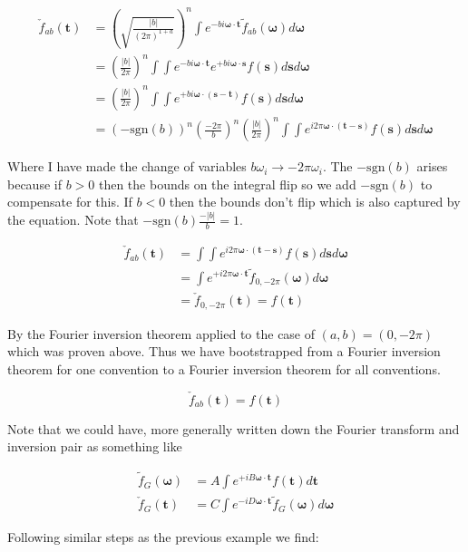 \documentclass[12pt]{article}
\newcommand{\bv}[1]{\boldsymbol{#1}}
\begin{document}
\begin{align*}
\check{f}_{ab}(\bv{t}) &= \left(\sqrt{\frac{|b|}{(2\pi)^{1+a}}}\right)^n\int e^{-b i\bv{\omega} \cdot \bv{t}}\tilde{f}_{ab}(\bv{\omega}) d\bv{\omega}\\
&= \left(\frac{|b|}{2\pi}\right)^n \int \int e^{-b i \bv{\omega} \cdot \bv{t}} e^{+ b i \bv{\omega} \cdot \bv{s}} f(\bv{s}) d\bv{s} d\bv{\omega}\\
&= \left(\frac{|b|}{2\pi}\right)^n \int \int e^{+b i \bv{\omega}\cdot(\bv{s}-\bv{t})} f(\bv{s}) d\bv{s} d\bv{\omega}\\
&= \left(-\text{sgn}(b)\right)^n \left( \frac{-2\pi}{b}\right)^n \left(\frac{|b|}{2\pi}\right)^n\int \int e^{i 2\pi \bv{\omega} \cdot (\bv{t}-\bv{s})}f(\bv{s}) d\bv{s} d\bv{\omega}
\end{align*}

Where I have made the change of variables $b \omega_i \to -2\pi \omega_i$. The $-\text{sgn}(b)$ arises because if $b>0$ then the bounds on the integral flip so we add $-\text{sgn}(b)$ to compensate for this. If $b<0$ then the bounds don't flip which is also captured by the equation. Note that $-\text{sgn}(b)\frac{-|b|}{b} =1$.

\begin{align}
\check{f}_{ab}(\bv{t}) &= \int \int e^{i 2\pi \bv{\omega} \cdot (\bv{t}-\bv{s})} f(\bv{s}) d\bv{s} d\bv{\omega}\\
&= \int e^{+i 2\pi \bv{\omega} \cdot \bv{t}} \tilde{f}_{0,-2\pi}(\bv{\omega}) d\bv{\omega}\\
&= \check{f}_{0,-2\pi}(\bv{t}) = f(\bv{t})
\end{align}

By the Fourier inversion theorem applied to the case of $(a,b) = (0,-2\pi)$ which was proven above. Thus we have bootstrapped from a Fourier inversion theorem for one convention to a Fourier inversion theorem for all conventions.

\[\check{f}_{ab}(\bv{t}) = f(\bv{t})\]

Note that we could have, more generally written down the Fourier transform and inversion pair as something like

\begin{align}
\tilde{f}_G(\bv{\omega}) &= A \int e^{+iB\bv{\omega}\cdot\bv{t}} f(\bv{t}) d\bv{t}\\
\check{f}_G(\bv{t}) &= C \int e^{-iD\bv{\omega}\cdot\bv{t}} \tilde{f}_G(\bv{\omega}) d\bv{\omega}
\end{align}

Following similar steps as the previous example we find:
\end{document}
